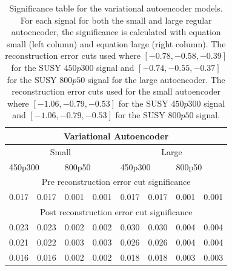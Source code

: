 \begin{table}[H]
    \centering
    \caption[Significance table variational autoencoder]{Significance table for the variational autoencoder models. For each signal for both the small and 
    large regular autoencoder, the significance is calculated with equation small (left column) and equation large (right column). The 
    reconstruction error cuts used where $[-0.78, -0.58, -0.39]$ for the SUSY $450p300$ signal and $[-0.74, -0.55, -0.37]$ for the SUSY 
    $800p50$ signal for the large autoencoder. The reconstruction error cuts used for the small autoencoder where $[-1.06, -0.79, -0.53]$ 
    for the SUSY $450p300$ signal and $[-1.06, -0.79, -0.53]$ for the SUSY $800p50$ signal. }
    \label{tab:VAE_2lep_significance}
    \begin{tabular}{|llllllll|}
    \hline
    \multicolumn{8}{|c|}{Variational Autoencoder}                                                                                                                                    \\ \hline
    \multicolumn{4}{|c|}{Small}                                                                    & \multicolumn{4}{c|}{Large}                                                  \\ \hline
    \multicolumn{2}{|l|}{450p300}                  & \multicolumn{2}{l|}{800p50}                   & \multicolumn{2}{l|}{450p300}                  & \multicolumn{2}{l|}{800p50} \\ \hline
    \multicolumn{8}{|c|}{Pre reconstruction error cut significance}                                                                                                                           \\ \hline
    \multicolumn{1}{|l|}{0.017} & \multicolumn{1}{l|}{0.017} & \multicolumn{1}{l|}{0.001} & \multicolumn{1}{l|}{0.001} & \multicolumn{1}{l|}{0.017} & \multicolumn{1}{l|}{0.017} & \multicolumn{1}{l|}{0.001}  & \multicolumn{1}{l|}{0.001} \\ \hline
    \multicolumn{8}{|c|}{Post reconstruction error  cut significance}                                                                                                                         \\ \hline
    \multicolumn{1}{|l|}{0.023} & \multicolumn{1}{l|}{0.023} & \multicolumn{1}{l|}{0.002} & \multicolumn{1}{l|}{0.002} & \multicolumn{1}{l|}{0.030} & \multicolumn{1}{l|}{0.030} & \multicolumn{1}{l|}{0.004}   & \multicolumn{1}{l|}{0.004}  \\ \hline
    \multicolumn{1}{|l|}{0.021} & \multicolumn{1}{l|}{0.022} & \multicolumn{1}{l|}{0.003} & \multicolumn{1}{l|}{0.003} & \multicolumn{1}{l|}{0.026} & \multicolumn{1}{l|}{0.026} & \multicolumn{1}{l|}{0.004}   & \multicolumn{1}{l|}{0.004}  \\ \hline
    \multicolumn{1}{|l|}{0.016} & \multicolumn{1}{l|}{0.016} & \multicolumn{1}{l|}{0.002} & \multicolumn{1}{l|}{0.002} & \multicolumn{1}{l|}{0.018} & \multicolumn{1}{l|}{0.018} & \multicolumn{1}{l|}{0.003}   & \multicolumn{1}{l|}{0.003} \\ \hline
    \end{tabular}
\end{table}

